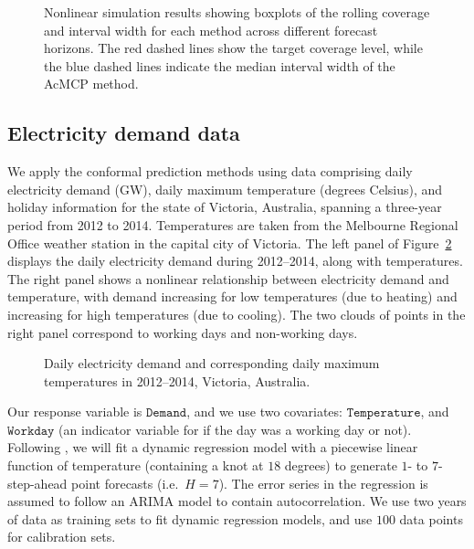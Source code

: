 \documentclass[
  11pt,
  a4paper,
]{article}
\theoremstyle{plain}
\theoremstyle{remark}
\begin{document}
\begin{figure}


\caption{\label{fig-NL_box}Nonlinear simulation results showing boxplots
of the rolling coverage and interval width for each method across
different forecast horizons. The red dashed lines show the target
coverage level, while the blue dashed lines indicate the median interval
width of the AcMCP method.}

\end{figure}%

\FloatBarrier

\subsection{Electricity demand data}\label{electricity-demand-data}

We apply the conformal prediction methods using data comprising daily
electricity demand (GW), daily maximum temperature (degrees Celsius),
and holiday information for the state of Victoria, Australia, spanning a
three-year period from 2012 to 2014. Temperatures are taken from the
Melbourne Regional Office weather station in the capital city of
Victoria. The left panel of Figure~\ref{fig-elec_data} displays the
daily electricity demand during 2012--2014, along with temperatures. The
right panel shows a nonlinear relationship between electricity demand
and temperature, with demand increasing for low temperatures (due to
heating) and increasing for high temperatures (due to cooling). The two
clouds of points in the right panel correspond to working days and
non-working days.

\begin{figure}[!b]


\caption{\label{fig-elec_data}Daily electricity demand and corresponding
daily maximum temperatures in 2012--2014, Victoria, Australia.}

\end{figure}%

Our response variable is \(\texttt{Demand}\), and we use two covariates:
\(\texttt{Temperature}\), and \(\texttt{Workday}\) (an indicator
variable for if the day was a working day or not). Following
\textcite{hyndman2021}, we will fit a dynamic regression model with a
piecewise linear function of temperature (containing a knot at \(18\)
degrees) to generate \(1\)- to \(7\)-step-ahead point forecasts
(i.e.~\(H=7\)). The error series in the regression is assumed to follow
an ARIMA model to contain autocorrelation. We use two years of data as
training sets to fit dynamic regression models, and use \(100\) data
points for calibration sets.
\end{document}
